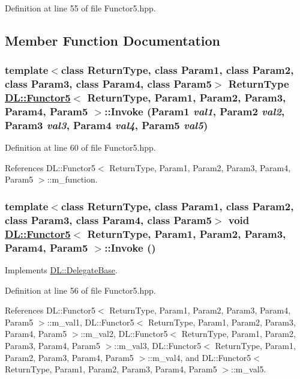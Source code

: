 Definition at line 55 of file Functor5.hpp.

\subsection{Member Function Documentation}
\hypertarget{classDL_1_1Functor5_a3}{
\subsubsection[Invoke]{\setlength{\rightskip}{0pt plus 5cm}template$<$class Return\-Type, class Param1, class Param2, class Param3, class Param4, class Param5$>$ Return\-Type \hyperlink{classDL_1_1Functor5}{DL::Functor5}$<$ Return\-Type, Param1, Param2, Param3, Param4, Param5 $>$::Invoke (Param1 {\em val1}, Param2 {\em val2}, Param3 {\em val3}, Param4 {\em val4}, Param5 {\em val5})}}
\label{classDL_1_1Functor5_a3}




Definition at line 60 of file Functor5.hpp.

References DL::Functor5$<$ Return\-Type, Param1, Param2, Param3, Param4, Param5 $>$::m\_\-function.\hypertarget{classDL_1_1Functor5_a2}{
\subsubsection[Invoke]{\setlength{\rightskip}{0pt plus 5cm}template$<$class Return\-Type, class Param1, class Param2, class Param3, class Param4, class Param5$>$ void \hyperlink{classDL_1_1Functor5}{DL::Functor5}$<$ Return\-Type, Param1, Param2, Param3, Param4, Param5 $>$::Invoke ()}}
\label{classDL_1_1Functor5_a2}




Implements \hyperlink{classDL_1_1DelegateBase_a2}{DL::Delegate\-Base}.

Definition at line 56 of file Functor5.hpp.

References DL::Functor5$<$ Return\-Type, Param1, Param2, Param3, Param4, Param5 $>$::m\_\-val1, DL::Functor5$<$ Return\-Type, Param1, Param2, Param3, Param4, Param5 $>$::m\_\-val2, DL::Functor5$<$ Return\-Type, Param1, Param2, Param3, Param4, Param5 $>$::m\_\-val3, DL::Functor5$<$ Return\-Type, Param1, Param2, Param3, Param4, Param5 $>$::m\_\-val4, and DL::Functor5$<$ Return\-Type, Param1, Param2, Param3, Param4, Param5 $>$::m\_\-val5.

